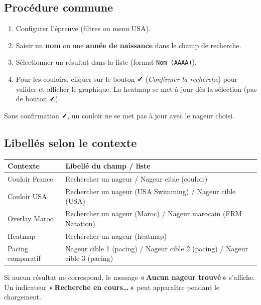 \documentclass[11pt,a4paper]{article}
\newcommand{\checkmark}{\textbf{✓}}
\begin{document}
\subsection{Procédure commune}

\begin{enumerate}
  \item Configurer l'épreuve (filtres ou menu USA).
  \item Saisir un \textbf{nom} ou une \textbf{année de naissance} dans le champ de recherche.
  \item Sélectionner un résultat dans la liste (format \texttt{Nom (AAAA)}).
  \item Pour les couloirs, cliquer sur le bouton \checkmark{} (\emph{Confirmer la recherche}) pour valider et afficher le graphique. La heatmap se met à jour dès la sélection (pas de bouton \checkmark{}).
\end{enumerate}

\noindent Sans confirmation \checkmark{}, un couloir ne se met pas à jour avec le nageur choisi.

\subsection{Libellés selon le contexte}

\begin{center}
\begin{tabular}{lp{10.2cm}}
\hline
\textbf{Contexte} & \textbf{Libellé du champ / liste} \\
\hline
Couloir France & Rechercher un nageur / Nageur cible (couloir) \\
Couloir USA & Rechercher un nageur (USA Swimming) / Nageur cible (USA) \\
Overlay Maroc & Rechercher un nageur (Maroc) / Nageur marocain (FRM Natation) \\
Heatmap & Rechercher un nageur (heatmap) \\
Pacing comparatif & Nageur cible 1 (pacing) / Nageur cible 2 (pacing) / Nageur cible 3 (pacing) \\
\hline
\end{tabular}
\end{center}

\noindent Si aucun résultat ne correspond, le message \textbf{«\,Aucun nageur trouvé\,»} s'affiche. Un indicateur \textbf{«\,Recherche en cours\ldots\,»} peut apparaître pendant le chargement.

\end{document}
